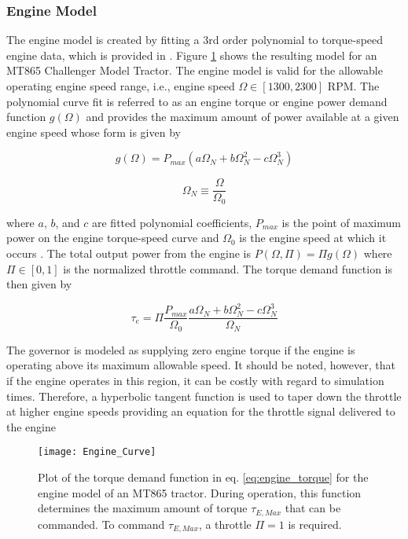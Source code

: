 \subsubsection{Engine Model}
The engine model is created by fitting a 3rd order polynomial to torque-speed engine data, which is provided in \cite{Caterpillar2002}. Figure \ref{fig:Engine_Curve} shows the resulting model for an MT865 Challenger Model Tractor. The engine model is valid for the allowable operating engine speed range, i.e., engine speed $\Omega \in [1300, 2300]$ RPM. The polynomial curve fit is referred to as an engine torque or engine power demand function $g(\Omega)$ and provides the maximum amount of power available at a given engine speed whose form is given by
\begin{linenomath*}
    \begin{equation}\label{eq:power_demand_function}
        g(\Omega) = P_{max}(a\Omega_N + b\Omega_N^2 - c\Omega_N^3)
    \end{equation}
\end{linenomath*}
\begin{linenomath*}
    \begin{equation}\label{eq:n_define}
        \Omega_N \equiv \frac{\Omega}{\Omega_0}
    \end{equation}
\end{linenomath*}
where $a$, $b$, and $c$ are fitted polynomial coefficients, $P_{max}$ is the point of maximum power on the engine torque-speed curve and $\Omega_0$ is the engine speed at which it occurs \cite{MathWorks2015GenericEngine}. The total output power from the engine is $P(\Omega,\Pi) = \Pi g(\Omega)$ where $\Pi \in [0,1]$ is the normalized throttle command. The torque demand function is then given by
\begin{linenomath*}
    \begin{equation}\label{eq:engine_torque}
        \tau_e = \Pi\frac{P_{max}}{\Omega_0}\frac{a\Omega_N + b\Omega_N^2 - c\Omega_N^3}{\Omega_N}
    \end{equation}
\end{linenomath*}
The governor is modeled as supplying zero engine torque if the engine is operating above its maximum allowable speed. It should be noted, however, that if the engine operates in this region, it can be costly with regard to simulation times. Therefore, a hyperbolic tangent function is used to taper down the throttle at higher engine speeds providing an equation for the throttle signal delivered to the engine
\begin{figure}[tb]
    \centering
    \texttt{[image: Engine\_Curve]}
    \vspace{-5pt}
    \caption{Plot of the torque demand function in eq. \ref{eq:engine_torque} for the engine model of an MT865 tractor. During operation, this function determines the maximum amount of torque $\tau_{E,Max}$ that can be commanded. To command $\tau_{E,Max}$, a throttle $\Pi = 1$ is required.}
    \label{fig:Engine_Curve}
\end{figure}
